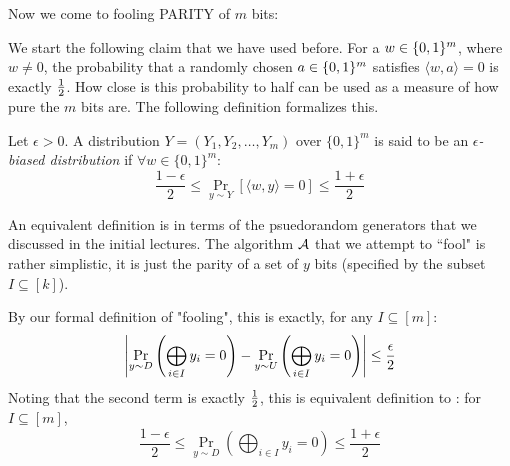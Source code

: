 Now we come to fooling {\sc PARITY} of $m$ bits:

We start the following claim that we have used before. For a $w \in \{0,1\}^m$, where $w \ne 0$, the probability that a randomly chosen $a \in \{0,1\}^m$ satisfies $\langle
w,a \rangle = 0$ is exactly $\frac{1}{2}$. How close is this probability to half can be used as a measure of how pure the $m$ bits are. The following definition formalizes this.
\begin{definition}
Let $\epsilon > 0$. A distribution $Y = (Y_1,Y_2, \ldots, Y_m)$ over $\{0,1\}^m$ is said to be an \textit{$\epsilon$-biased distribution }if $\forall w \in \{0,1\}^m$:
$$\frac{1-\epsilon}{2} \le \Pr_{y \sim Y}\left[ \langle w,y \rangle = 0 \right] \le \frac{1+\epsilon}{2}$$
\end{definition}
\noindent An equivalent definition is in terms of the psuedorandom generators that we discussed in the initial lectures. The algorithm ${\cal A}$ that we attempt to ``fool" is rather simplistic, it is just the parity of a set of $y$ bits (specified by the subset $I \subseteq [k]$). 

\hspace{-6mm}\begin{minipage}{0.55\linewidth}
By our formal definition of "fooling", this is exactly, for any $I \subseteq [m]$:
$$\left| \Pr_{y \sim D}\left( \bigoplus_{i \in I} y_i = 0 \right) - \Pr_{y \sim U} \left( \bigoplus_{i \in I} y_i = 0 \right) \right| \le \frac{\epsilon}{2}$$
Noting that the second term is exactly $\frac{1}{2}$, this is equivalent definition to : for $I \subseteq [m]$, 
$$\frac{1-\epsilon}{2} \le \Pr_{y \sim D}\left( \bigoplus_{i \in I} y_i = 0 \right) \le \frac{1+\epsilon}{2}$$
\end{minipage}
\begin{minipage}{0.01\linewidth}
~
\end{minipage}
\begin{minipage}{0.35\linewidth}
\end{minipage}

